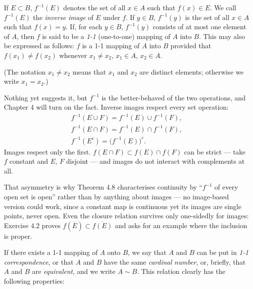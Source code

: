 If $E \subset B$, $f^{-1}(E)$ denotes the set of all $x \in A$ such that
$f(x) \in E$. We call $f^{-1}(E)$ the \emph{inverse image} of $E$ under
$f$. If $y \in B$,
$f^{-1}(y)$ is the set of all $x \in A$ such that $f(x) = y$. If, for each
$y \in B$, $f^{-1}(y)$ consists of at most one element of $A$, then $f$ is said
to be a \emph{1-1} (one-to-one) mapping of $A$ into $B$. This may also be
expressed as follows: $f$ is a 1-1 mapping of $A$ into $B$ provided that
$f(x_1) \ne f(x_2)$ whenever $x_1 \ne x_2$, $x_1 \in A$, $x_2 \in A$.

(The notation $x_1 \ne x_2$ means that $x_1$ and $x_2$ are distinct elements;
otherwise we write $x_1 = x_2$.)

\begin{deeper}
Nothing yet suggests it, but $f^{-1}$ is the better-behaved of the two
operations, and Chapter 4 will turn on the fact. Inverse images respect every
set operation:
\begin{gather*}
  f^{-1}(E \cup F) = f^{-1}(E)\cup f^{-1}(F),\\
  f^{-1}(E \cap F) = f^{-1}(E)\cap f^{-1}(F),\\
  f^{-1}(E^c) = \bigl(f^{-1}(E)\bigr)^c .
\end{gather*}
Images respect only the first. $f(E \cap F) \subset f(E) \cap f(F)$ can be
strict --- take $f$ constant and $E$, $F$ disjoint --- and images do not
interact with complements at all.

That asymmetry is why Theorem 4.8 characterises continuity by ``$f^{-1}$ of
every open set is open'' rather than by anything about images --- no
image-based version could work, since a constant map is continuous yet its
images are single points, never open. Even the closure relation survives only
one-sidedly for images: Exercise 4.2 proves
$f(\overline{E}) \subset \overline{f(E)}$ and asks for an example where the
inclusion is proper.
\end{deeper}

If there exists a 1-1 mapping of $A$ onto $B$, we say that $A$ and $B$ can be
put in \emph{1-1 correspondence}, or that $A$ and $B$ have the same
\emph{cardinal number}, or, briefly, that $A$ and $B$ are \emph{equivalent},
and we write $A \sim B$. This relation clearly has the following properties:

